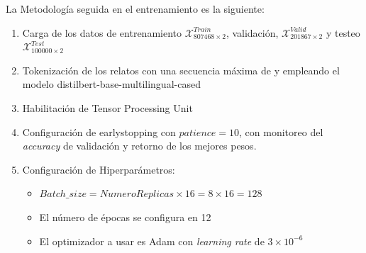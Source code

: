 \documentclass[onecolumn, journal, english, 12pt, a4paper]{IEEEtran} %
\newcommand{\modelohuggingface}{distilbert-base-multilingual-cased}
\theoremstyle{definition}
\begin{document}
La Metodología seguida en el entrenamiento es la siguiente:



\begin{enumerate}
  
\item Carga de los datos de entrenamiento
  $\mathbf{\mathcal{X}}^{Train}_{807468\times 2}$, validación,
  $\mathbf{\mathcal{X}}^{Valid}_{201867\times 2}$ y testeo
  $\mathbf{\mathcal{X}}^{Test}_{100000 \times 2}$
  \item Tokenización de los relatos con una secuencia máxima de
     y empleando el modelo \modelohuggingface
  \item Habilitación de Tensor Processing Unit
  \item Configuración de earlystopping con $patience=10$, con
    monitoreo del \emph{accuracy} de validación y retorno de los
    mejores pesos.
  \item Configuración de Hiperparámetros:
            \begin{itemize}
            \item
              $Batch\_size = NumeroReplicas \times 16 = 8 \times 16 =
              128$
                \item El número de épocas se configura en 12
                \item El optimizador a usar es Adam con \emph{learning rate} de $3\times 10^{-6}$
            \end{itemize}
    \end{enumerate}
\end{document}
